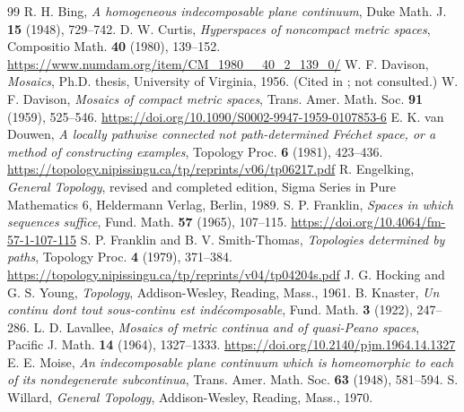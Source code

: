 \documentclass[11pt]{amsart}
\theoremstyle{definition}
\theoremstyle{remark}
\numberwithin{equation}{section}
\begin{document}
\begin{thebibliography}{99}
 R. H. Bing, \emph{A homogeneous indecomposable plane continuum}, Duke Math. J. \textbf{15} (1948), 729--742.
 D. W. Curtis, \emph{Hyperspaces of noncompact metric spaces}, Compositio Math. \textbf{40} (1980), 139--152. \url{https://www.numdam.org/item/CM_1980__40_2_139_0/}
 W. F. Davison, \emph{Mosaics}, Ph.D. thesis, University of Virginia, 1956. (Cited in \cite{lavallee64}; not consulted.)
 W. F. Davison, \emph{Mosaics of compact metric spaces}, Trans. Amer. Math. Soc. \textbf{91} (1959), 525--546. \url{https://doi.org/10.1090/S0002-9947-1959-0107853-6}
 E. K. van Douwen, \emph{A locally pathwise connected not path-determined Fr\'echet space, or a method of constructing examples}, Topology Proc. \textbf{6} (1981), 423--436. \url{https://topology.nipissingu.ca/tp/reprints/v06/tp06217.pdf}
 R. Engelking, \emph{General Topology}, revised and completed edition, Sigma Series in Pure Mathematics 6, Heldermann Verlag, Berlin, 1989.
 S. P. Franklin, \emph{Spaces in which sequences suffice}, Fund. Math. \textbf{57} (1965), 107--115. \url{https://doi.org/10.4064/fm-57-1-107-115}
 S. P. Franklin and B. V. Smith-Thomas, \emph{Topologies determined by paths}, Topology Proc. \textbf{4} (1979), 371--384. \url{https://topology.nipissingu.ca/tp/reprints/v04/tp04204s.pdf}
 J. G. Hocking and G. S. Young, \emph{Topology}, Addison-Wesley, Reading, Mass., 1961.
 B. Knaster, \emph{Un continu dont tout sous-continu est ind\'ecomposable}, Fund. Math. \textbf{3} (1922), 247--286.
 L. D. Lavallee, \emph{Mosaics of metric continua and of quasi-Peano spaces}, Pacific J. Math. \textbf{14} (1964), 1327--1333. \url{https://doi.org/10.2140/pjm.1964.14.1327}
 E. E. Moise, \emph{An indecomposable plane continuum which is homeomorphic to each of its nondegenerate subcontinua}, Trans. Amer. Math. Soc. \textbf{63} (1948), 581--594.
 S. Willard, \emph{General Topology}, Addison-Wesley, Reading, Mass., 1970.
\end{thebibliography}
\end{document}
